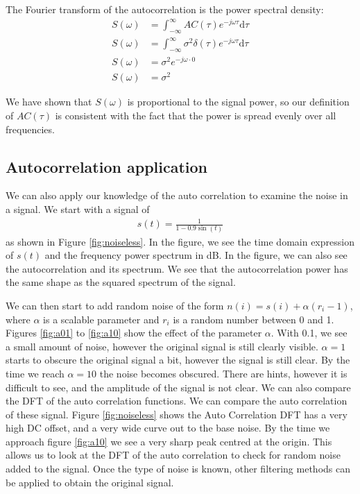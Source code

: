 \documentclass[twocolumn]{myarticle}
\renewcommand{\d}{\mathrm{d}}
\begin{document}
The Fourier transform of the autocorrelation is the power spectral density:
\begin{align}
    S(\omega) &= \int_{-\infty}^{\infty} AC(\tau) e^{-j\omega \tau} \d \tau
    \\
    S(\omega) &= \int_{-\infty}^{\infty} \sigma^2 \delta(\tau) e^{-j\omega \tau} \d \tau
    \\
    S(\omega) &= \sigma^2 e^{-j \omega \cdot 0}
    \\
    S(\omega) &= \sigma^2 
\end{align}

We have shown that $ S(\omega) $ is proportional to the signal power, so our definition of $ AC(\tau) $ is consistent with the fact that the power is spread evenly over all frequencies.

\subsection{Autocorrelation application}
\label{subsec:autocorrelation_application}

We can also apply our knowledge of the auto correlation to examine the noise in a signal. 
We start with a signal of 
\begin{align}
    s(t) = \frac{1}{1-0.9\sin(t)}
\end{align}
as shown in Figure \ref{fig:noiseless}. 
In the figure, we see the time domain expression of $ s(t) $ and the frequency power spectrum in dB.
In the figure, we can also see the autocorrelation and its spectrum.
We see that the autocorrelation power has the same shape as the squared spectrum of the signal.

We can then start to add random noise of the form $n(i) = s(i) + \alpha (r_{i} -1)$, where $\alpha$ is a scalable parameter and $r_{i}$ is a random number between 0 and 1. 
Figures \ref{fig:a01} to \ref{fig:a10} show the effect of the parameter $\alpha$. 
With 0.1, we see a small amount of noise, however the original signal is still clearly visible. 
$\alpha = 1$ starts to obscure the original signal a bit, however the signal is still clear. 
By the time we reach $\alpha = 10$ the noise becomes obscured. 
There are hints, however it is difficult to see, and the amplitude of the signal is not clear. 
We can also compare the DFT of the auto correlation functions. 
We can compare the auto correlation of these signal. 
Figure \ref{fig:noiseless} shows the Auto Correlation DFT has a very high DC offset, and a very wide curve out to the base noise. 
By the time we approach figure \ref{fig:a10} we see a very sharp peak centred at the origin. 
This allows us to look at the DFT of the auto correlation to check for random noise added to the signal. 
Once the type of noise is known, other filtering methods can be applied to obtain the original signal.
\end{document}
